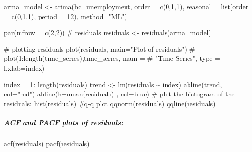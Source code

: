 \documentclass[
  letterpaper,
  DIV=11,
  numbers=noendperiod]{scrartcl}
\let\oldsubparagraph\subparagraph
\renewcommand{\subparagraph}[1]{\oldsubparagraph{#1}\mbox{}}
\newenvironment{Shaded}{\begin{snugshade}}{\end{snugshade}}
\newcommand{\AttributeTok}[1]{\textcolor[rgb]{0.40,0.45,0.13}{#1}}
\newcommand{\CommentTok}[1]{\textcolor[rgb]{0.37,0.37,0.37}{#1}}
\newcommand{\DecValTok}[1]{\textcolor[rgb]{0.68,0.00,0.00}{#1}}
\newcommand{\FunctionTok}[1]{\textcolor[rgb]{0.28,0.35,0.67}{#1}}
\newcommand{\NormalTok}[1]{\textcolor[rgb]{0.00,0.23,0.31}{#1}}
\newcommand{\OtherTok}[1]{\textcolor[rgb]{0.00,0.23,0.31}{#1}}
\newcommand{\SpecialCharTok}[1]{\textcolor[rgb]{0.37,0.37,0.37}{#1}}
\newcommand{\StringTok}[1]{\textcolor[rgb]{0.13,0.47,0.30}{#1}}
\begin{document}
\begin{Shaded}
\begin{Highlighting}[]
\NormalTok{arma\_model }\OtherTok{\textless{}{-}} \FunctionTok{arima}\NormalTok{(bc\_unemployment, }\AttributeTok{order =} \FunctionTok{c}\NormalTok{(}\DecValTok{0}\NormalTok{,}\DecValTok{1}\NormalTok{,}\DecValTok{1}\NormalTok{), }\AttributeTok{seasonal =} \FunctionTok{list}\NormalTok{(}\AttributeTok{order =} \FunctionTok{c}\NormalTok{(}\DecValTok{0}\NormalTok{,}\DecValTok{1}\NormalTok{,}\DecValTok{1}\NormalTok{), }\AttributeTok{period =} \DecValTok{12}\NormalTok{), }\AttributeTok{method=}\StringTok{"ML"}\NormalTok{)}

\FunctionTok{par}\NormalTok{(}\AttributeTok{mfrow =} \FunctionTok{c}\NormalTok{(}\DecValTok{2}\NormalTok{,}\DecValTok{2}\NormalTok{))}
\CommentTok{\# residuals}
\NormalTok{residuals }\OtherTok{\textless{}{-}} \FunctionTok{residuals}\NormalTok{(arma\_model)}

\CommentTok{\# plotting residuals}
\FunctionTok{plot}\NormalTok{(residuals, }\AttributeTok{main=}\StringTok{"Plot of residuals"}\NormalTok{)}
\CommentTok{\# plot(1:length(time\_series),time\_series, main =}
\CommentTok{\# "Time Series", type = \textquotesingle{}l\textquotesingle{},xlab=\textquotesingle{}index\textquotesingle{})}

\NormalTok{index }\OtherTok{=} \DecValTok{1}\SpecialCharTok{:} \FunctionTok{length}\NormalTok{(residuals)}
\NormalTok{trend }\OtherTok{\textless{}{-}} \FunctionTok{lm}\NormalTok{(residuals }\SpecialCharTok{\textasciitilde{}}\NormalTok{ index)}
\FunctionTok{abline}\NormalTok{(trend, }\AttributeTok{col=}\StringTok{"red"}\NormalTok{)}
\FunctionTok{abline}\NormalTok{(}\AttributeTok{h=}\FunctionTok{mean}\NormalTok{(residuals) , }\AttributeTok{col=}\StringTok{\textquotesingle{}blue\textquotesingle{}}\NormalTok{)}
\CommentTok{\# plot the histogram of the residuals:}
\FunctionTok{hist}\NormalTok{(residuals)}
\CommentTok{\#q{-}q plot}
\FunctionTok{qqnorm}\NormalTok{(residuals)}
\FunctionTok{qqline}\NormalTok{(residuals)}
\end{Highlighting}
\end{Shaded}

\hypertarget{acf-and-pacf-plots-of-residuals-1}{%
\subparagraph{ACF and PACF plots of
residuals:}\label{acf-and-pacf-plots-of-residuals-1}}

\begin{Shaded}
\begin{Highlighting}[]
\FunctionTok{acf}\NormalTok{(residuals)}
\FunctionTok{pacf}\NormalTok{(residuals)}
\end{Highlighting}
\end{Shaded}
\end{document}
